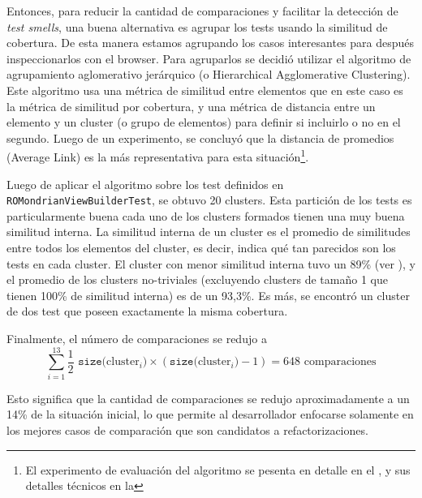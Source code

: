 \par Entonces, para reducir la cantidad de comparaciones y facilitar la detección de \emph{test smells}, una buena alternativa es agrupar los tests usando la similitud de cobertura. De esta manera estamos agrupando los casos interesantes para después inspeccionarlos con el browser. Para agruparlos se decidió utilizar el algoritmo de agrupamiento aglomerativo jerárquico (o Hierarchical Agglomerative Clustering). Este algoritmo usa una métrica de similitud entre elementos que en este caso es la métrica de similitud por cobertura, y una métrica de distancia entre un elemento y un cluster (o grupo de elementos) para definir si incluirlo o no en el segundo. Luego de un experimento, se concluyó que la distancia de promedios (Average Link) es la más representativa para esta situación\footnote{El experimento de evaluación del algoritmo se pesenta en detalle en el , y sus detalles técnicos en la  }.

\par Luego de aplicar el algoritmo sobre los test definidos en {\tt ROMondrianViewBuilderTest}, se obtuvo 20 clusters. Esta partición de los tests es particularmente buena cada uno de los clusters formados tienen una muy buena similitud interna. La similitud interna de un cluster es el promedio de similitudes entre todos los elementos del cluster, es decir, indica qué tan parecidos son los tests en cada cluster. El cluster con menor similitud interna tuvo un 89\% (ver ), y el promedio de los clusters no-triviales (\ie excluyendo clusters de tamaño 1 que tienen 100\% de similitud interna) es de un 93,3\%. Es más, se encontró un cluster de dos test que poseen exactamente la misma cobertura. 



\par Finalmente, el número de comparaciones se redujo a 
	\[ \sum_{i=1}^{13} \frac{1}{2} \,\, \texttt{size(}\textrm{cluster}_i\texttt{)} \times \left( \texttt{size(}\textrm{cluster}_i\texttt{)} -1 \right) = 648 \textrm{ comparaciones} \]

\par Esto significa que la cantidad de comparaciones se redujo aproximadamente a un 14\% de la situación inicial, lo que permite al desarrollador enfocarse solamente en los mejores casos de comparación que son candidatos a refactorizaciones.

